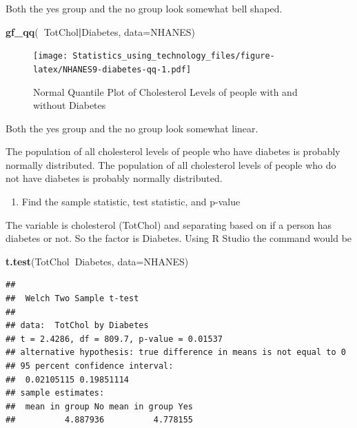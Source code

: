 \documentclass[
]{book}
\newenvironment{Shaded}{\begin{snugshade}}{\end{snugshade}}
\newcommand{\DataTypeTok}[1]{\textcolor[rgb]{0.13,0.29,0.53}{#1}}
\newcommand{\KeywordTok}[1]{\textcolor[rgb]{0.13,0.29,0.53}{\textbf{#1}}}
\newcommand{\NormalTok}[1]{#1}
\newcommand{\OperatorTok}[1]{\textcolor[rgb]{0.81,0.36,0.00}{\textbf{#1}}}
\providecommand{\tightlist}{%
  \setlength{\itemsep}{0pt}\setlength{\parskip}{0pt}}
\begin{document}
Both the yes group and the no group look somewhat bell shaped.



\begin{Shaded}
\begin{Highlighting}[]
\KeywordTok{gf_qq}\NormalTok{(}\OperatorTok{~}\NormalTok{TotChol}\OperatorTok{|}\NormalTok{Diabetes, }\DataTypeTok{data=}\NormalTok{NHANES)}
\end{Highlighting}
\end{Shaded}

\begin{figure}
\centering
\texttt{[image: Statistics\_using\_technology\_files/figure-latex/NHANES9-diabetes-qq-1.pdf]}
\caption{\label{fig:NHANES9-diabetes-qq}Normal Quantile Plot of Cholesterol Levels of people with and without Diabetes}
\end{figure}

Both the yes group and the no group look somewhat linear.

The population of all cholesterol levels of people who have diabetes is probably normally distributed. The population of all cholesterol levels of people who do not have diabetes is probably normally distributed.

\begin{enumerate}
\def\labelenumi{\arabic{enumi}.}
\setcounter{enumi}{3}
\tightlist
\item
  Find the sample statistic, test statistic, and p-value
\end{enumerate}

The variable is cholesterol (TotChol) and separating based on if a person has diabetes or not. So the factor is Diabetes. Using R Studio the command would be

\begin{Shaded}
\begin{Highlighting}[]
\KeywordTok{t.test}\NormalTok{(TotChol}\OperatorTok{~}\NormalTok{Diabetes, }\DataTypeTok{data=}\NormalTok{NHANES)}
\end{Highlighting}
\end{Shaded}

\begin{verbatim}
## 
##  Welch Two Sample t-test
## 
## data:  TotChol by Diabetes
## t = 2.4286, df = 809.7, p-value = 0.01537
## alternative hypothesis: true difference in means is not equal to 0
## 95 percent confidence interval:
##  0.02105115 0.19851114
## sample estimates:
##  mean in group No mean in group Yes 
##          4.887936          4.778155
\end{verbatim}
\end{document}
